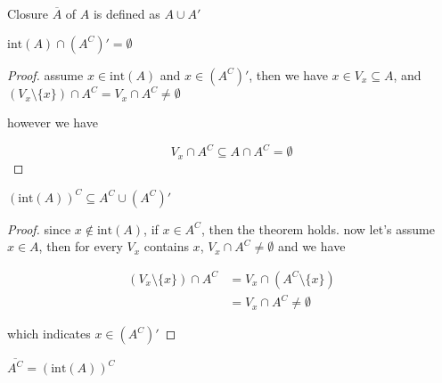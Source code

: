 \begin{definition}[Closure]
    Closure $\overline{A}$ of $A$ is defined as $A \cup A'$
\end{definition}



\begin{lem}
    $\mathrm{int}(A) \cap (A^C)' = \emptyset$
\end{lem}

\begin{proof}
    assume $x \in \mathrm{int}(A)$ and $x \in (A^C)'$, then we have $x \in V_x \subseteq A$, and 
    $(V_x \setminus \{ x\}) \cap A^C = V_x \cap A^C \ne \emptyset$

    however we have

    \[
        V_x \cap A^C \subseteq A \cap A^C = \emptyset
    \]
\end{proof}

\begin{lem}\label{lem:A-int-comp-subseteq-A-closure}
    $\left( \mathrm{int}(A) \right)^C \subseteq A^C \cup (A^C)'$
\end{lem}

\begin{proof}
    since $x \notin \mathrm{int}(A)$, if $x \in A^C$, then the theorem holds.
    now let's assume $x \in A$,
    then for every $V_x$ contains $x$, $V_x \cap A^C \ne \emptyset$ and we have

    \begin{align*}
        \left( V_x \setminus \{ x \} \right) \cap A^C &= V_x \cap \left( A^C \setminus \{ x \} \right)  \\
        &= V_x \cap A^C  \ne \emptyset
    \end{align*}

    which indicates $x \in (A^C)'$
\end{proof}

\begin{lem}
    $\overline{A^C} = \left( \mathrm{int}(A) \right)^C $
\end{lem}

